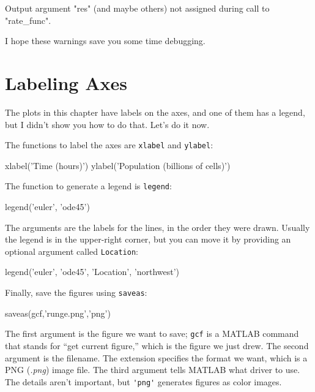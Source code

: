 \begin{code}
Output argument "res" (and maybe others) not assigned during call
to "rate_func".
\end{code}

I hope these warnings save you some time debugging.

\section{Labeling Axes}

The plots in this chapter have labels on the axes, and one of them has a legend, but I didn't show you how to do that.  Let's do it now.


The functions to label the axes are \lstinline{xlabel} and \lstinline{ylabel}:

\begin{code}
xlabel('Time (hours)')
ylabel('Population (billions of cells)')
\end{code}

The function to generate a legend is \lstinline{legend}:

\begin{code}
legend('euler', 'ode45')
\end{code}


The arguments are the labels for the lines, in the order they were drawn.  Usually the legend is in the upper-right corner, but you can move it by providing an optional argument called \lstinline{Location}:

\begin{code}
legend('euler', 'ode45', 'Location', 'northwest')
\end{code}

Finally,  save the figures using \lstinline{saveas}:

\begin{code}
saveas(gcf,'runge.png','png')
\end{code}

The first argument is the figure we want to save; \lstinline{gcf} is a MATLAB command that stands for ``get current figure,'' which is the figure we just drew.  The second argument is the filename.  The extension specifies the format we want, which is a PNG (\emph{.png}) image file.  The third argument tells MATLAB what driver to use.  The details aren't important, but \lstinline{'png'} generates figures as color images.

